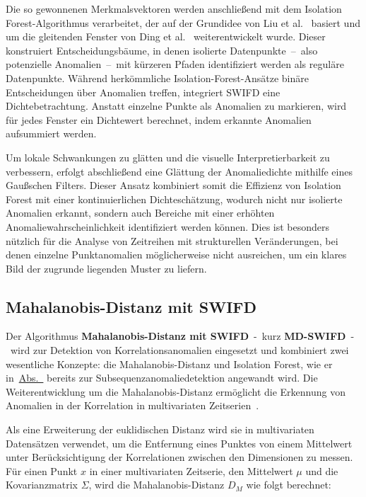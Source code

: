 Die so gewonnenen Merkmalsvektoren werden anschließend mit dem Isolation Forest-Algorithmus verarbeitet, der auf der Grundidee von Liu et al.~\cite{Liu2012}
basiert und um die gleitenden Fenster von Ding et al.~\cite{Ding2013} weiterentwickelt wurde. Dieser konstruiert Entscheidungsbäume, in denen isolierte
Datenpunkte~–~also potenzielle Anomalien~–~mit kürzeren Pfaden identifiziert werden als
reguläre Datenpunkte. Während herkömmliche Isolation-Forest-Ansätze binäre Entscheidungen über Anomalien treffen, integriert SWIFD eine Dichtebetrachtung.
Anstatt einzelne Punkte als Anomalien zu markieren, wird für jedes Fenster ein Dichtewert berechnet, indem erkannte Anomalien aufsummiert werden.

Um lokale Schwankungen zu glätten und die visuelle Interpretierbarkeit zu verbessern, erfolgt abschließend eine Glättung der Anomaliedichte mithilfe eines
Gaußschen Filters. Dieser Ansatz kombiniert somit die Effizienz von Isolation Forest mit einer kontinuierlichen Dichteschätzung, wodurch nicht nur isolierte
Anomalien erkannt, sondern auch Bereiche mit einer erhöhten Anomaliewahrscheinlichkeit identifiziert werden können. Dies ist besonders nützlich für die
Analyse von Zeitreihen mit strukturellen Veränderungen, bei denen einzelne Punktanomalien möglicherweise nicht ausreichen, um ein klares Bild der zugrunde
liegenden Muster zu liefern.

\subsection{Mahalanobis-Distanz mit SWIFD}
Der Algorithmus \textbf{Mahalanobis-Distanz mit SWIFD}~-~kurz \textbf{MD-SWIFD}~-~wird zur Detektion von Korrelationsanomalien eingesetzt und kombiniert zwei
wesentliche Konzepte: die Mahala\-nobis-Distanz und Isolation Forest, wie er in~\hyperref[subsec:swifd]{Abs.~} bereits
zur Subsequenzanomaliedetektion angewandt wird. Die Weiterentwicklung um die Mahalanobis-Distanz ermöglicht die Erkennung von Anomalien in der Korrelation
in multivariaten Zeitserien~\cite{McLachlan1999}.

Als eine Erweiterung der euklidischen Distanz wird sie in multivariaten Datensätzen verwendet, um die Entfernung eines Punktes von einem Mittelwert unter
Berücksichtigung der Korrelationen zwischen den Dimensionen zu messen. Für einen Punkt $x$ in einer multivariaten Zeitserie, den Mittelwert $\mu$ und die
Kovarianzmatrix $\Sigma$, wird die Mahalanobis-Distanz $D_M$ wie folgt berechnet:

